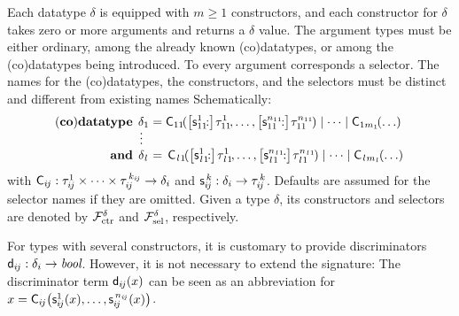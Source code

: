 \newcommand\elll{\kern.18ex l\kern.11ex}
\newcommand\elllx{\kern.11ex l\kern.18ex}

Each datatype $\delta$ is equipped with
$m \ge 1$ constructors, and each constructor for $\delta$ takes zero or more
arguments and returns a $\delta$ value. The argument types must be either
ordinary, among the already known (co)datatypes, or among the (co)datatypes
being introduced.
%
To every argument corresponds a selector. The names for the (co)data\-types, the
constructors, and the selectors must be distinct and different from
existing names%
Schematically:
%
\[
\begin{aligned}[t]
\!(\keyw{co})\keyw{datatype}\;\,
  \delta_1 & {}= \smash{\const{C}_{11\!}(\bigl[\const{s}_{11\!}^1{:}\bigr]\vthinspace \tau_{11\!}^1, \ldots, \bigl[\const{s}_{11\!}^{n_{11\!}}{:}\bigr]\vthinspace \tau_{11\!}^{n_{11\!}})} \mid \cdots \mid \smash{\const{C}_{1m_1\!}(\ldots)} \\
   \smash{\vdots\,\,\,} \\[-1\jot]
  \keyw{and}\; \,\delta_{\elllx} & =\, \smash{\const{C}_{\elll 1\!}(\bigl[\const{s}_{\elll 1\!}^1{:}\bigr]\vthinspace \tau_{\elll 1\!}^1, \ldots, \bigl[\const{s}_{\elll 1\!}^{n_{\elll 1\!}}{:}\bigr]\vthinspace \tau_{\elll 1\!}^{n_{\elll 1\!}})} \mid \cdots \mid \smash{\const{C}_{\elll m_{\elllx}\!}(\ldots)}
\end{aligned}
\]
%
with
$\textsf{C}_{i\kern-0.083333em j} : \tau_{i\kern-0.083333em j}^1\times\cdots\times\tau_{i\kern-0.083333em j}^{\,k_{\smash{i\kern-0.083333em j}}} \to \delta_i$
and $\textsf{s}_{i\kern-0.083333em j}^{\,k} : \delta_i \to \tau_{i\kern-0.083333em j}^{\,k}$. Defaults are assumed for
the selector names if they are omitted. Given a type $\delta$, its
constructors and selectors are denoted by $\mathcal{F}_{\mathrm{ctr}}^\delta$ and $\mathcal{F}_{\mathrm{sel}}^\delta$,
respectively.

For types with several constructors, it is customary to provide discriminators
$\textsf{d}_{i\kern-0.083333em j} : \delta_i \to \textit{bool}$. However,
it is not necessary to extend the signature:
The discriminator term $\textsf{d}_{i\kern-0.083333em j}(x)$ can be seen as an abbreviation for
$x = \textsf{C}_{i\kern-0.083333em j}\bigl(\textsf{s}_{i\kern-0.083333em j}^1(x), \ldots, \textsf{s}_{i\kern-0.083333em j}^{\,n_{\smash{{i\kern-0.083333em j}}}}(x)\bigr)$.

